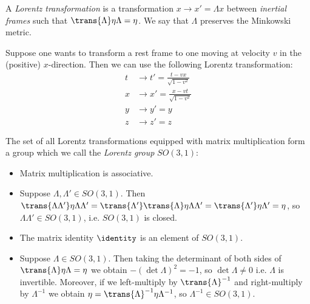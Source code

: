 \documentclass{jknotes} %
\begin{document}
\begin{defn}
    A \emph{Lorentz transformation} is a transformation \(x \rightarrow x' = \Lambda x\) between \emph{inertial frames} such that \(\trans{\Lambda}\eta\Lambda=\eta\). We say that \(\Lambda\) preserves the Minkowski metric.
\end{defn}

\begin{eg}
    Suppose one wants to transform a rest frame to one moving at velocity \(v\) in the (positive) \(x\)-direction. Then we can use the following Lorentz transformation:
    \begin{align}
        t &\rightarrow t' = \frac{t-vx}{\sqrt{1-v^2}} \\
        x &\rightarrow x' = \frac{x-vt}{\sqrt{1-v^2}} \\
        y &\rightarrow y' = y \\
        z &\rightarrow z' = z
    \end{align}
\end{eg}

The set of all Lorentz transformations equipped with matrix multiplication form a group which we call the \emph{Lorentz group} \(SO(3,1)\):
\begin{itemize}
    \item Matrix multiplication is associative.
    \item Suppose \(\Lambda,\Lambda' \in SO(3,1)\). Then \(\trans{\Lambda\Lambda'}\eta\Lambda\Lambda' = \trans{\Lambda'}\trans{\Lambda}\eta\Lambda\Lambda' = \trans{\Lambda'}\eta\Lambda' = \eta\), so \(\Lambda\Lambda' \in SO(3,1)\), i.e. \(SO(3,1)\) is closed.
    \item The matrix identity \(\identity\) is an element of \(SO(3,1)\).
    \item Suppose \(\Lambda \in SO(3,1)\). Then taking the determinant of both sides of \(\trans{\Lambda}\eta\Lambda = \eta\) we obtain \(-(\det\Lambda)^2=-1\), so \(\det\Lambda \ne 0\) i.e. \(\Lambda\) is invertible. Moreover, if we left-multiply by \(\trans{\Lambda}^{-1}\) and right-multiply by \(\Lambda^{-1}\) we obtain \(\eta = \trans{\Lambda}^{-1}\eta\Lambda^{-1}\), so \(\Lambda^{-1} \in SO(3,1)\).
\end{itemize}
\end{document}
